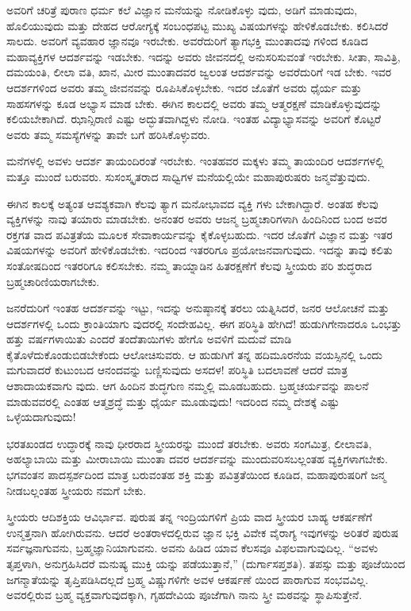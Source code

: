 ಅವರಿಗೆ ಚರಿತ್ರೆ ಪುರಾಣ ಧರ್ಮ ಕಲೆ ವಿಜ್ಞಾನ ಮನೆಯನ್ನು ನೋಡಿಕೊಳ್ಳು ವುದು, ಅಡಿಗೆ ಮಾಡುವುದು, ಹೊಲಿಯುವುದು ಮತ್ತು ದೇಹದ ಆರೋಗ್ಯಕ್ಕೆ ಸಂಬಂಧಪಟ್ಟ ಮುಖ್ಯ ವಿಷಯಗಳನ್ನು ಹೇಳಿಕೊಡಬೇಕು. ಕಲಿಸಿದರೆ ಸಾಲದು. ಅವರಿಗೆ ವ್ಯವಹಾರ ಜ್ಞಾನವೂ ಇರಬೇಕು. ಅವರೆದುರಿಗೆ ತ್ಯಾಗಭಕ್ತಿ ಮುಂತಾದವು ಗಳಿಂದ ಕೂಡಿದ ಮಹಾವ್ಯಕ್ತಿಗಳ ಆದರ್ಶವನ್ನು ಇಡಬೇಕು. ಇದನ್ನು ಅವರು ಜೀವನದಲ್ಲಿ ಅನುಸರಿಸುವಂತೆ ಇರಬೇಕು. ಸೀತಾ, ಸಾವಿತ್ರಿ, ದಮಯಂತಿ, ಲೀಲಾ ವತಿ, ಖಾನ, ಮೀರ ಮುಂತಾದವರ ಜ್ವಲಂತ ಆದರ್ಶವನ್ನು ಅವರೆದುರಿಗೆ ಇಡ ಬೇಕು. ಇವರ ಆದರ್ಶಗಳಿಂದ ಅವರು ತಮ್ಮ ಜೀವನವನ್ನು ರೂಪಿಸಿಕೊಳ್ಳಬೇಕು. ಇದರ ಜೊತೆಗೆ ಅವರು ಧೈರ್ಯ ಮತ್ತು ಸಾಹಸಗಳನ್ನು ಕೂಡ ಅಭ್ಯಾಸ ಮಾಡ ಬೇಕು. ಈಗಿನ ಕಾಲದಲ್ಲಿ ಅವರು ತಮ್ಮ ಆತ್ಮರಕ್ಷಣೆ ಮಾಡಿಕೊಳ್ಳುವುದನ್ನು ಕಲಿಯಬೇಕಾಗಿದೆ. ಝಾನ್ಸಿರಾಣಿ ಎಷ್ಟು ಅದ್ಭುತವಾಗಿದ್ದಳು ನೋಡಿ. ಇಂತಹ ವಿದ್ಯಾಭ್ಯಾಸವನ್ನು ಅವರಿಗೆ ಕೊಟ್ಟರೆ ಅವರು ತಮ್ಮ ಸಮಸ್ಯೆಗಳನ್ನು ತಾವೇ ಬಗೆ ಹರಿಸಿಕೊಳ್ಳುವರು.

ಮನೆಗಳಲ್ಲಿ ಅವಳು ಆದರ್ಶ ತಾಯಂದಿರಂತೆ ಇರಬೇಕು. ಇಂತಹವರ ಮಕ್ಕಳು ತಮ್ಮ ತಾಯಂದಿರ ಆದರ್ಶಗಳಲ್ಲಿ ಮತ್ತೂ ಮುಂದೆ ಬರುವರು. ಸುಸಂಸ್ಕೃತರಾದ ಸಾಧ್ವಿಗಳ ಮನೆಯಲ್ಲಿಯೇ ಮಹಾಪುರುಷರು ಜನ್ಮವೆತ್ತುವುದು.

ಈಗಿನ ಕಾಲಕ್ಕೆ ಅತ್ಯಂತ ಆವಶ್ಯಕವಾಗಿ ಕೆಲವು ತ್ಯಾಗ ಮನೋಭಾವದ ವ್ಯಕ್ತಿ ಗಳು ಬೇಕಾಗಿದ್ದಾರೆ. ಅಂತಹ ಕೆಲವು ವ್ಯಕ್ತಿಗಳನ್ನು ನಾವು ತಯಾರು ಮಾಡಬೇಕು. ಅನಂತರ ಅವರು ಆಜನ್ಮ ಬ್ರಹ್ಮಚಾರಿಗಳಾಗಿ ಹಿಂದಿನಿಂದ ಬಂದ ಅವರ ರಕ್ತಗತ ವಾದ ಪವಿತ್ರತೆಯ ಮೂಲಕ ಸೇವಾಕಾರ್ಯವನ್ನು ಕೈಕೊಳ್ಳಬಹುದು. ಇದರ ಜೊತೆಗೆ ವಿಜ್ಞಾನ ಮತ್ತು ಇತರ ವಿಷಯಗಳನ್ನು ಅವರಿಗೆ ಹೇಳಿಕೊಡಬೇಕು. ಇದರಿಂದ ಇತರರಿಗೂ ಪ್ರಯೋಜನವಾಗುವುದು. ಇದನ್ನು ತಾವು ಕಲಿತು ಸಂತೋಷದಿಂದ ಇತರರಿಗೂ ಕಲಿಸಬೇಕು. ನಮ್ಮ ತಾಯ್ನಾಡಿನ ಹಿತರಕ್ಷಣೆಗೆ ಕೆಲವು ಸ್ತ್ರೀಯರು ಪರಿ ಶುದ್ಧರಾದ ಬ್ರಹ್ಮಚಾರಿಣಿಯರಾಗಬೇಕು.

ಜನರೆದುರಿಗೆ ಇಂತಹ ಆದರ್ಶವನ್ನು ಇಟ್ಟು, ಇದನ್ನು ಅನುಷ್ಠಾನಕ್ಕೆ ತರಲು ಯತ್ನಿಸಿದರೆ, ಜನರ ಆಲೋಚನೆ ಮತ್ತು ಆದರ್ಶಗಳಲ್ಲಿ ಒಂದು ಕ್ರಾಂತಿಯಾಗು ವುದರಲ್ಲಿ ಸಂದೇಹವಿಲ್ಲ. ಈಗ ಪರಿಸ್ಥಿತಿ ಹೇಗಿದೆ! ಹುಡುಗಿಗೇನಾದರೂ ಒಂಭತ್ತು ಹತ್ತು ವರ್ಷಗಳಾಯಿತು ಎಂದರೆ ತಂದೆತಾಯಿಗಳು ಹೇಗೊ ಅವಳಿಗೆ ಮದುವೆ ಮಾಡಿ ಕೈತೊಳೆದುಕೊಂಡುಬಿಡಬೇಕೆಂದು ಆಲೋಚಿಸುವರು. ಆ ಹುಡುಗಿಗೆ ತನ್ನ ಹದಿಮೂರನೆಯ ವಯಸ್ಸಿನಲ್ಲಿ ಒಂದು ಮಗುವಾದರೆ ಕುಟುಂಬದ ಆನಂದವನ್ನು ಬಣ್ಣಿಸುವುದು ಅಸದಳ! ಪರಿಸ್ಥಿತಿ ಬದಲಾವಣೆ ಆದರೆ ಮಾತ್ರ ಆಶಾದಾಯಕವಾಗು ವುದು. ಆಗ ಹಿಂದಿನ ಶುದ್ಧಗುಣ ನಮ್ಮಲ್ಲಿ ಮೂಡಬಹುದು. ಬ್ರಹ್ಮಚರ್ಯವನ್ನು ಪಾಲನೆ ಮಾಡುವವರಲ್ಲಿ ಎಂತಹ ಆತ್ಮಶ್ರದ್ಧೆ ಮತ್ತು ಧೈರ್ಯ ಮೂಡುವುದು! ಇದರಿಂದ ನಮ್ಮ ದೇಶಕ್ಕೆ ಎಷ್ಟು ಒಳ್ಳೆಯದಾಗುವುದು!

ಭರತಖಂಡದ ಉದ್ಧಾರಕ್ಕೆ ನಾವು ಧೀರರಾದ ಸ್ತ್ರೀಯರನ್ನು ಮುಂದೆ ತರಬೇಕು. ಅವರು ಸಂಗಮಿತ್ರ, ಲೀಲಾವತಿ, ಅಹಲ್ಯಾಬಾಯಿ ಮತ್ತು ಮೀರಾಬಾಯಿ ಮುಂತಾ ದವರ ಆದರ್ಶವನ್ನು ಮುಂದುವರಿಸಬಲ್ಲಂತಹ ವ್ಯಕ್ತಿಗಳಾಗಬೇಕು. ಭಗವಂತನ ಪಾದಸ್ಪರ್ಶದಿಂದ ಮಾತ್ರ ಬರುವಂತಹ ಶಕ್ತಿ ಮತ್ತು ಪವಿತ್ರತೆಯಿಂದ ಕೂಡಿದ, ಮಹಾಪುರುಷರಿಗೆ ಜನ್ಮ ನೀಡಬಲ್ಲಂತಹ ಸ್ತ್ರೀಯರು ನಮಗೆ ಬೇಕು.

ಸ್ತ್ರೀಯರು ಆದಿಶಕ್ತಿಯ ಆವಿರ್ಭಾವ. ಪುರುಷ ತನ್ನ ಇಂದ್ರಿಯಗಳಿಗೆ ಪ್ರಿಯ ವಾದ ಸ್ತ್ರೀಯರ ಬಾಹ್ಯ ಆಕರ್ಷಣೆಗೆ ಉನ್ಮತ್ತನಾಗಿ ಹೋಗಿರುವನು. ಆದರೆ ಅಂತರಾಳದಲ್ಲಿರುವ ಜ್ಞಾನ ಭಕ್ತಿ ವಿವೇಕ ವೈರಾಗ್ಯ ಇವುಗಳನ್ನು ಅರಿತರೆ ಪುರುಷ ಸರ್ವಜ್ಞನಾಗುವನು, ಬ್ರಹ್ಮಜ್ಞಾನಿಯಾಗುವನು. ಅವನು ಹಿಡಿದ ಯಾವ ಕೆಲಸವೂ ವಿಫಲವಾಗುವುದಿಲ್ಲ. “ಅವಳು ತೃಪ್ತಳಾಗಿ, ಅನುಗ್ರಹಿಸಿದರೆ ಮನುಷ್ಯ ಮುಕ್ತಿ ಯನ್ನು ಪಡೆಯುತ್ತಾನೆ,” (ದುರ್ಗಾಸಪ್ತಶತಿ). ತಪಸ್ಸು ಮತ್ತು ಪೂಜೆಯಿಂದ ಜಗನ್ಮಾತೆಯನ್ನು ತೃಪ್ತಿಪಡಿಸಿದಲ್ಲದೆ ಬ್ರಹ್ಮ ವಿಷ್ಣುಗಳಿಗೇ ಅವಳ ಆಕರ್ಷಣೆ ಯಿಂದ ಪಾರಾಗುವ ಸಂಭವವಿಲ್ಲ. ಅವರಲ್ಲಿರುವ ಬ್ರಹ್ಮ ವ್ಯಕ್ತವಾಗುವುದಕ್ಕಾಗಿ, ಗೃಹದೇವಿಯ ಪೂಜೆಗಾಗಿ ನಾನು ಸ್ತ್ರೀ ಮಠವನ್ನು ಸ್ಥಾಪಿಸುತ್ತೇನೆ.

